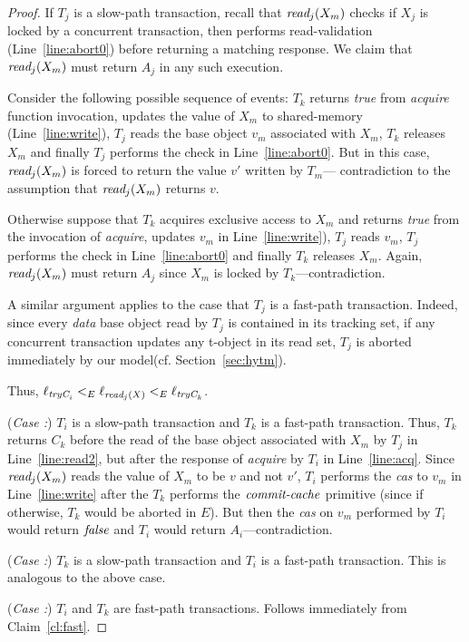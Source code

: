 \begin{proof}
If $T_j$ is a slow-path transaction, 
recall that $\textit{read}_j(X_m)$ checks if $X_j$ is locked by a concurrent transaction, 
then performs read-validation (Line~\ref{line:abort0}) before returning a matching response. 
We claim that $\textit{read}_j(X_m)$ must return $A_j$ in any such execution.

Consider the following possible sequence of events: 
$T_k$ returns \emph{true} from \emph{acquire} function invocation, 
updates the value of $X_m$ to shared-memory (Line~\ref{line:write}), 
$T_j$ reads the base object $v_m$ associated with $X_m$, 
$T_k$ releases $X_m$ and finally $T_j$ performs the check in Line~\ref{line:abort0}. 
But in this case, $\textit{read}_j(X_m)$ is forced to return the value $v'$ written by $T_m$--- 
contradiction to the assumption that $\textit{read}_j(X_m)$ returns $v$. 

Otherwise suppose that $T_k$ acquires exclusive access to $X_m$ and returns \emph{true}
from the invocation of \emph{acquire}, updates $v_m$ in Line~\ref{line:write}), 
$T_j$ reads $v_m$, $T_j$ performs the check in Line~\ref{line:abort0} and finally $T_k$ 
releases $X_m$. 
Again, $\textit{read}_j(X_m)$ must return $A_j$ since $X_m$ is locked by $T_k$---contradiction.

A similar argument applies to the case that $T_j$ is a fast-path transaction.
Indeed, since every \emph{data} base object read by $T_j$ is contained in its tracking set, if any concurrent
transaction updates any t-object in its read set, $T_j$ is aborted immediately by our model(cf. Section~\ref{sec:hytm}).

Thus, $\ell_{\textit{tryC}_i} <_E \ell_{\textit{read}_j(X)} <_{E} \ell_{\textit{tryC}_k}$.

(\textit{Case :}) $T_i$ is a slow-path transaction and $T_k$ is a fast-path transaction.
Thus, $T_k$ returns $C_k$ 
before the read of the base object associated with $X_m$ by $T_j$ in Line~\ref{line:read2}, but after the response
of \emph{acquire} by $T_i$ in Line~\ref{line:acq}.
Since $\textit{read}_j(X_m)$ reads the value of $X_m$ to be $v$ and not $v'$, $T_i$ performs the \emph{cas}
to $v_m$ in Line~\ref{line:write} after the $T_k$ performs the $\ms{commit-cache}$ primitive (since if
otherwise, $T_k$ would be aborted in $E$).
But then the \emph{cas} on $v_m$ performed by $T_i$ would return $\mathit{false}$ and $T_i$ would return $A_i$---contradiction.

(\textit{Case :}) $T_k$ is a slow-path transaction and $T_i$ is a fast-path transaction.
This is analogous to the above case.

(\textit{Case :}) $T_i$ and $T_k$ are fast-path transactions.
Follows immediately from Claim~\ref{cl:fast}.


\end{proof}
